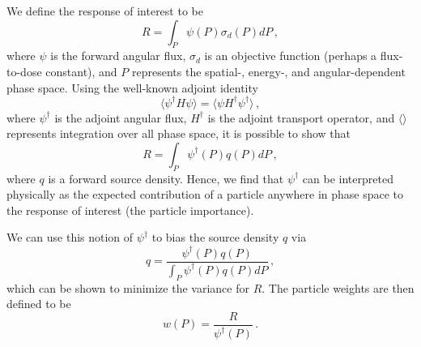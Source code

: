 We define the response of interest to be
\begin{equation}
 R = \int_P \psi (P) \sigma_d(P)dP \, ,
\end{equation}
where $\psi$ is the forward angular flux, $\sigma_d$ is an objective function
(perhaps a flux-to-dose constant), and $P$ represents the spatial-, energy-, and
angular-dependent phase space.  Using the well-known adjoint identity
\begin{equation}
 \langle \psi^\dag H \psi \rangle = \langle \psi H^\dag \psi^\dag \rangle \, ,
\end{equation}
where $\psi^\dag$ is the adjoint angular flux, $H^\dag$ is the adjoint transport
operator, and  $\langle \rangle$ represents integration over all phase space, it
is possible to show that 
\begin{equation}
 R = \int_P \psi^\dag (P) q(P)dP \, ,
\end{equation}
where $q$ is a forward source density.  Hence, we find that $\psi^\dag$ can be
interpreted physically as the expected contribution of a particle anywhere in
phase space to the response of interest (\ie the particle importance).

We can use this notion of $\psi^\dag$ to bias the source density $q$ via
\begin{equation}
 \hat{q} = \frac{\psi^\dag(P) q(P) }{ \int_P \psi^\dag(P) q(P) dP } \, ,
 \label{eq:biassrc}
\end{equation}
which can be shown to minimize the variance for $R$.  The particle weights are
then defined to be
\begin{equation}
 w(P) = \frac{R}{\psi^\dag(P)} \, .
\end{equation}

